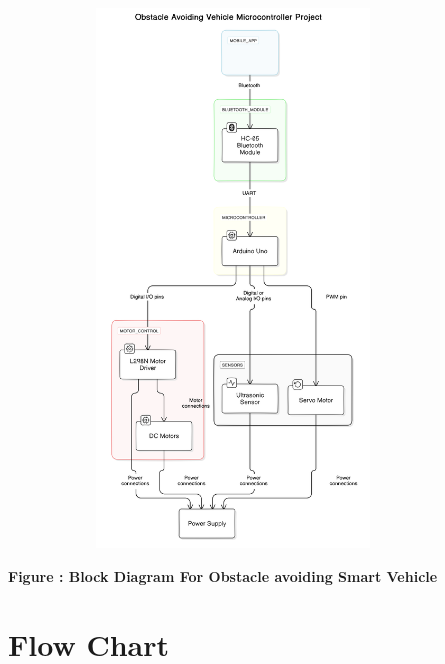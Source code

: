 \documentclass[12pt,a4paper]{report}
\begin{document}
\begin{center}
    {\includegraphics[width=450px, height=540px]{BD.png}}
\end{center}
\begin{center}
    \parbox{0.8\textwidth}{ 
        \centering
        \textbf{Figure : Block Diagram For Obstacle avoiding Smart Vehicle}
    }
\end{center}

\chapter*{Flow Chart}
\end{document}
